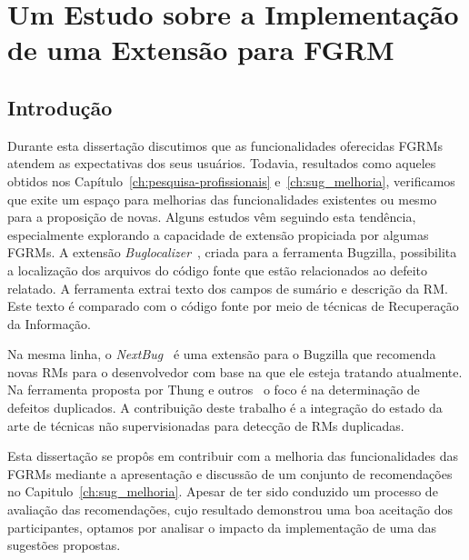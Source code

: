 \chapter{Um Estudo sobre a Implementação de uma Extensão para FGRM}
\label{ch:implemtacao_extensao}

\section{Introdução}
\label{sec:implemtacao_extensao_intro}

Durante esta dissertação discutimos que as funcionalidades oferecidas FGRMs
atendem as expectativas dos seus usuários. Todavia, resultados como aqueles
obtidos nos Capítulo~\ref{ch:pesquisa-profissionais} e~\ref{ch:sug_melhoria},
verificamos que exite um espaço para melhorias das funcionalidades existentes ou
mesmo para a proposição de novas. Alguns estudos vêm seguindo esta tendência,
especialmente explorando a capacidade de extensão propiciada por algumas FGRMs.
A extensão \textit{Buglocalizer}~\cite{Thung:2014:BIT:2635868.2661678}, criada
para a ferramenta Bugzilla, possibilita a localização dos arquivos do código
fonte que estão relacionados ao defeito relatado. A ferramenta extrai texto dos
campos de sumário e descrição da RM\@. Este texto é comparado com o código fonte
por meio de técnicas de Recuperação da Informação.

Na mesma linha, o \textit{NextBug}~\cite{101186} é uma extensão para o Bugzilla
que recomenda novas RMs para o desenvolvedor com base na que ele esteja tratando
atualmente. Na ferramenta proposta por Thung e
outros~\cite{Thung:2014:DIT:2642937.2648627} o foco é na determinação de
defeitos duplicados. A contribuição deste trabalho é a integração do estado da
arte de técnicas não supervisionadas para detecção de RMs duplicadas.

Esta dissertação se propôs em contribuir com a melhoria das funcionalidades das
FGRMs mediante a apresentação e discussão de um conjunto de recomendações no
Capitulo~\ref{ch:sug_melhoria}. Apesar de ter sido conduzido um processo de
avaliação das recomendações, cujo resultado demonstrou uma boa aceitação dos
participantes, optamos por analisar o impacto da implementação de uma das
sugestões propostas.

